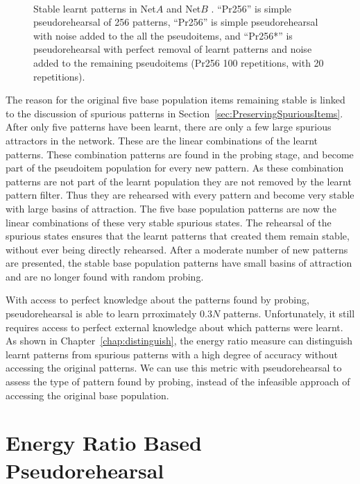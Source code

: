 \begin{figure}[p]
\center
\small
	
	\vspace{1cm}\\
	
	\caption{Stable learnt patterns in Net$A$  and Net$B$ . ``Pr256'' is simple pseudorehearsal of 256 patterns, ``Pr256\noiseConst{}'' is simple pseudorehearsal with noise added to the all the pseudoitems, and ``Pr256*\noiseConst{}'' is pseudorehearsal with perfect removal of learnt patterns and noise added to the remaining pseudoitems (Pr256 100 repetitions, with \noiseConst{} 20 repetitions).}
	\label{fig:PseudoNoise}
\end{figure}

The reason for the original five base population items remaining stable is linked to the discussion of spurious patterns in Section~\ref{sec:PreservingSpuriousItems}.  After only five patterns have been learnt, there are only a few large spurious attractors in the network.  These are the linear combinations of the learnt patterns.  These combination patterns are found in the probing stage, and become part of the pseudoitem population for every new pattern.  As these combination patterns are not part of the learnt population they are not removed by the learnt pattern filter.  Thus they are rehearsed with every pattern and become very stable with large basins of attraction.  The five base population patterns are now the linear combinations of these very stable spurious states.  The rehearsal of the spurious states ensures that the learnt patterns that created them remain stable, without ever being directly rehearsed.  After a moderate number of new patterns are presented, the stable base population patterns have small basins of attraction and are no longer found with random probing.  

With access to perfect knowledge about the patterns found by probing, pseudorehearsal is able to learn prroximately $0.3N$ patterns.  Unfortunately, it still requires access to perfect external knowledge about which patterns were learnt.  As shown in Chapter~\ref{chap:distinguish}, the energy ratio measure can distinguish learnt patterns from spurious patterns with a high degree of accuracy without accessing the original patterns.  We can use this metric with pseudorehearsal to assess the type of pattern found by probing, instead of the infeasible approach of accessing the original base population.  

\section{Energy Ratio Based Pseudorehearsal}


